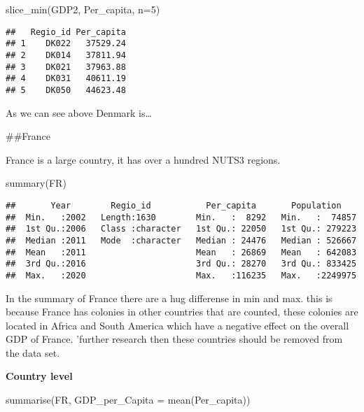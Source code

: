 \documentclass[
]{article}
\newenvironment{Shaded}{\begin{snugshade}}{\end{snugshade}}
\newcommand{\AttributeTok}[1]{\textcolor[rgb]{0.77,0.63,0.00}{#1}}
\newcommand{\DecValTok}[1]{\textcolor[rgb]{0.00,0.00,0.81}{#1}}
\newcommand{\FunctionTok}[1]{\textcolor[rgb]{0.00,0.00,0.00}{#1}}
\newcommand{\NormalTok}[1]{#1}
\begin{document}
\begin{Shaded}
\begin{Highlighting}[]
\FunctionTok{slice\_min}\NormalTok{(GDP2, Per\_capita, }\AttributeTok{n=}\DecValTok{5}\NormalTok{)}
\end{Highlighting}
\end{Shaded}

\begin{verbatim}
##   Regio_id Per_capita
## 1    DK022   37529.24
## 2    DK014   37811.94
## 3    DK021   37963.88
## 4    DK031   40611.19
## 5    DK050   44623.48
\end{verbatim}

As we can see above Denmark is\ldots{}

\#\#France

France is a large country, it has over a hundred NUTS3 regions.

\begin{Shaded}
\begin{Highlighting}[]
\FunctionTok{summary}\NormalTok{(FR)}
\end{Highlighting}
\end{Shaded}

\begin{verbatim}
##       Year        Regio_id           Per_capita       Population     
##  Min.   :2002   Length:1630        Min.   :  8292   Min.   :  74857  
##  1st Qu.:2006   Class :character   1st Qu.: 22050   1st Qu.: 279223  
##  Median :2011   Mode  :character   Median : 24476   Median : 526667  
##  Mean   :2011                      Mean   : 26869   Mean   : 642083  
##  3rd Qu.:2016                      3rd Qu.: 28270   3rd Qu.: 833425  
##  Max.   :2020                      Max.   :116235   Max.   :2249975
\end{verbatim}

In the summary of France there are a hug differense in min and max. this
is because France has colonies in other countries that are counted,
these colonies are located in Africa and South America which have a
negative effect on the overall GDP of France. 'further research then
these countries should be removed from the data set.

\textbf{Country level}

\begin{Shaded}
\begin{Highlighting}[]
    \FunctionTok{summarise}\NormalTok{(FR, }\AttributeTok{GDP\_per\_Capita =} \FunctionTok{mean}\NormalTok{(Per\_capita))}
\end{Highlighting}
\end{Shaded}
\end{document}
